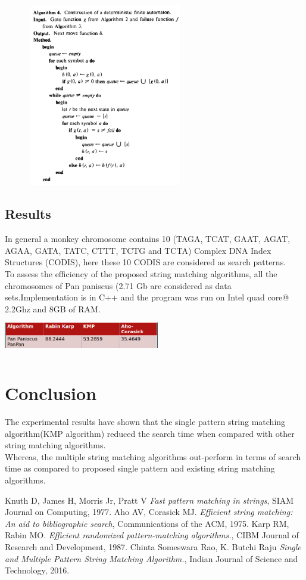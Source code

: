 \documentclass[a4paper,11pt,twocolumn]{article}
\begin{document}
\begin{figure}[H]
\includegraphics[width=6.8cm,height=8cm]{algo4}
\end{figure} 
\subsection{Results}
In general a monkey chromosome contains 10 (TAGA,
TCAT, GAAT, AGAT, AGAA, GATA, TATC, CTTT, TCTG
and TCTA) Complex DNA Index Structures (CODIS),
here these 10 CODIS are considered as search patterns.\\
To assess the efficiency of the proposed string matching
algorithms, all the chromosomes of  Pan paniscus (2.71 Gb are considered as data
sets.Implementation is in C++ and the program was run on Intel quad core@ 2.2Ghz and 8GB of RAM.\\
\includegraphics[width=6.8cm,height=1.8cm]{time}
\section{Conclusion}
The experimental results have shown that the single pattern string matching algorithm(KMP algorithm) reduced the search time when compared with other string matching algorithms. \\
Whereas, the multiple string matching algorithms out-perform in terms of search time as compared to proposed single pattern and existing string matching algorithms. 

\begin{thebibliography}{}
 Knuth D, James H, Morris Jr, Pratt V \textit{Fast pattern matching
in strings}, SIAM Journal on Computing, 1977.
Aho AV, Corasick MJ. \textit{Efficient string matching: An aid to
bibliographic search},  Communications of the ACM, 1975.
Karp RM, Rabin MO. \textit{Efficient randomized pattern-matching
algorithms.},  CIBM Journal of Research and Development, 1987.
Chinta Someswara Rao, K. Butchi Raju \textit{Single and Multiple Pattern String Matching Algorithm.},  Indian Journal of Science and Technology, 2016.
\end{thebibliography}{}
\end{document}
